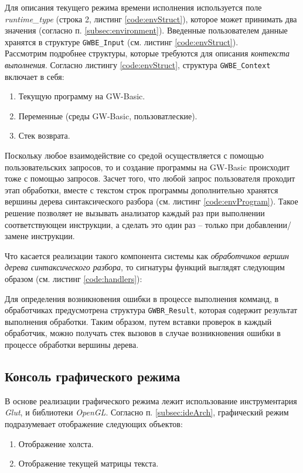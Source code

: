 \documentclass[12pt]{article}
\begin{document}
			\indent Для описания текущего режима времени исполнения используется поле {\it runtime\_type} (строка 2, листинг \ref{code:envStruct}), которое может принимать два значения (согласно п. \ref{subsec:environment}). Введенные пользователем данные хранятся в структуре {\tt GWBE\_Input} (см. листинг \ref{code:envStruct}). \\
			\indent Рассмотрим подробнее структуры, которые требуются для описания {\it контекста выполнения}. Согласно листингу \ref{code:envStruct}, структура {\tt GWBE\_Context} включает в себя:
			\begin{enumerate}
				\item Текущую программу на GW-Basic.
				\item Переменные (среды GW-Basic, пользоватлеские).
				\item Стек возврата.
			\end{enumerate}
		 	
			\indent Поскольку любое взаимодействие со средой осуществляется с помощью пользовательских запросов, то и создание программы на GW-Basic происходит тоже с помощью запросов. Засчет того, что любой запрос пользователя проходит этап обработки, вместе с текстом строк программы дополнительно хранятся вершины дерева синтаксического разбора (см. листинг \ref{code:envProgram}). Такое решение позволяет не вызывать анализатор каждый раз при выполнении соответствующеи инструкции, а сделать это один раз -- только при добавлении/замене инструкции.
			
			
			\indent Что касается реализации такого компонента системы как {\it обработчиков вершин дерева синтаксического разбора}, то сигнатуры функций выглядят следующим образом (см. листинг \ref{code:handlers}):
			
			
			\indent Для определения возникновения ошибки в процессе выполнения комманд, в обработчиках предусмотрена структура {\tt GWBR\_Result}, которая содержит результат выполнения обработки. Таким образом, путем вставки проверок в каждый обработчик, можно получать стек вызовов в случае возникновения ошибки в процессе обработки вершины дерева. 
		\subsection{Консоль графического режима}
			\hspace{\parindent} В основе реализации графического режима лежит использование инструментария {\it Glut}, и библиотеки {\it OpenGL}. Согласно п. \ref{subsec:ideArch}, графический режим подразумевает отображение следующих объектов:
			\begin{enumerate}
				\item Отображение холста.
				\item Отображение текущей матрицы текста.
			\end{enumerate}
			
\end{document}
